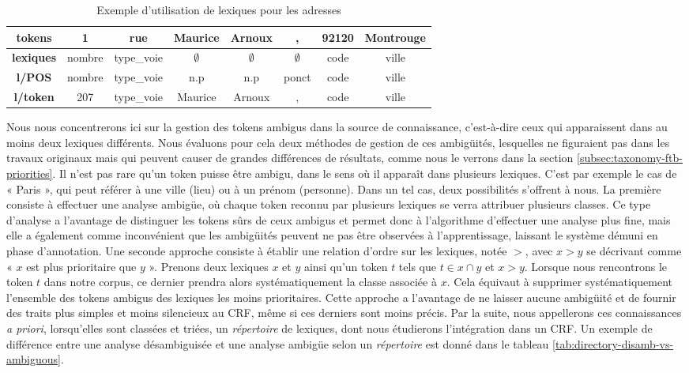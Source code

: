 \documentclass[PhD-Yoann-Dupont.tex]{subfiles}
\begin{document}
\begin{table}[ht!]
\centering
\begin{tabular}{|c|ccccccc|}
\hline
\textbf{tokens}      & 1      & rue        & Maurice     & Arnoux      & ,           & 92120 & Montrouge \\
\hline
\textbf{lexiques}  & nombre & type\_voie & $\emptyset$ & $\emptyset$ & $\emptyset$ & code  & ville \\
\textbf{l/POS}     & nombre & type\_voie & n.p         & n.p         & ponct       & code  & ville \\
\textbf{l/token}     & 207    & type\_voie & Maurice     & Arnoux      & ,           & code  & ville \\
\hline
\end{tabular}
\caption{Exemple d'utilisation de lexiques pour les adresses}
\label{tab:ontology-address-example}
\end{table}

Nous nous concentrerons ici sur la gestion des tokens ambigus dans la source de connaissance, c'est-à-dire ceux qui apparaissent dans au moins deux lexiques différents. Nous évaluons pour cela deux méthodes de gestion de ces ambigüités, lesquelles ne figuraient pas dans les travaux originaux mais qui peuvent causer de grandes différences de résultats, comme nous le verrons dans la section \ref{subsec:taxonomy-ftb-priorities}. Il n'est pas rare qu'un token puisse être ambigu, dans le sens où il apparaît dans plusieurs lexiques. C'est par exemple le cas de « Paris », qui peut référer à une ville (lieu) ou à un prénom (personne). Dans un tel cas, deux possibilités s'offrent à nous. La première consiste à effectuer une analyse ambigüe, où chaque token reconnu par plusieurs lexiques se verra attribuer plusieurs classes. Ce type d'analyse a l'avantage de distinguer les tokens sûrs de ceux ambigus et permet donc à l'algorithme d'effectuer une analyse plus fine, mais elle a également comme inconvénient que les ambigüités peuvent ne pas être observées à l'apprentissage, laissant le système démuni en phase d'annotation. Une seconde approche consiste à établir une relation d'ordre sur les lexiques, notée $>$, avec $x > y$ se décrivant comme « $x$ est plus prioritaire que $y$ ». Prenons deux lexiques $x$ et $y$ ainsi qu'un token $t$ tels que $t \in x \cap y$ et $x > y$. Lorsque nous rencontrons le token $t$ dans notre corpus, ce dernier prendra alors systématiquement la classe associée à $x$. Cela équivaut à supprimer systématiquement l'ensemble des tokens ambigus des lexiques les moins prioritaires. Cette approche a l'avantage de ne laisser aucune ambigüité et de fournir des traits plus simples et moins silencieux au CRF, même si ces derniers sont moins précis. Par la suite, nous appellerons ces connaissances \emph{a priori}, lorsqu'elles sont classées et triées, un \emph{répertoire} de lexiques, dont nous étudierons l'intégration dans un CRF. Un exemple de différence entre une analyse désambiguisée et une analyse ambigüe selon un \emph{répertoire} est donné dans le tableau \ref{tab:directory-disamb-vs-ambiguous}.
\end{document}
